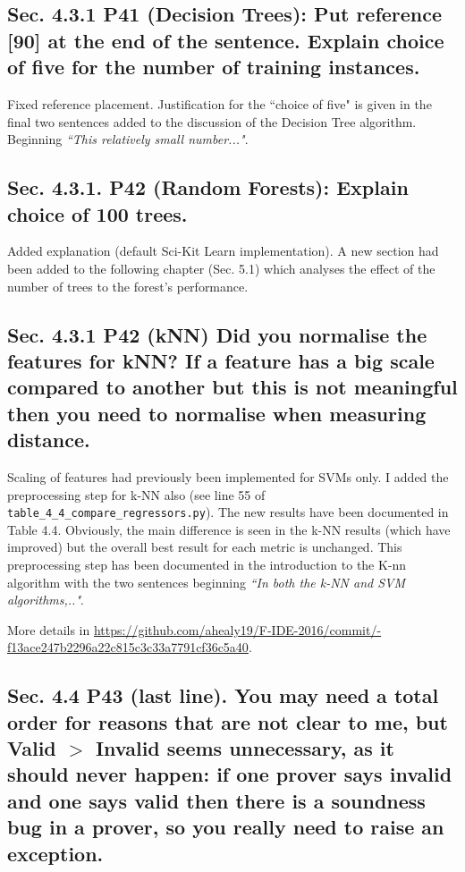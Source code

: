 \documentclass[]{article}
\begin{document}
\subsection{Sec. 4.3.1 P41 (Decision Trees): Put reference [90] at the end of the sentence. Explain choice of five for the number of training instances.}

Fixed reference placement. Justification for the ``choice of five" is given in the final two sentences added to the discussion of the Decision Tree algorithm. Beginning \emph{``This relatively small number..."}. 

\subsection{Sec. 4.3.1. P42 (Random Forests): Explain choice of 100 trees.} 
	
Added explanation (default Sci-Kit Learn implementation).
A new section had been added to the following chapter (Sec. 5.1) which analyses the effect of the number of trees to the forest's performance.	
	
\subsection{Sec. 4.3.1 P42 (kNN) Did you normalise the features for kNN? If a feature has a big scale compared to another but this is not meaningful then you need to normalise when measuring distance.}

Scaling of features had previously been implemented for SVMs only. I added the preprocessing step for k-NN also (see line 55 of \texttt{table\_4\_4\_compare\_regressors.py}). 
The new results have been documented in Table 4.4. 
Obviously, the main difference is seen in the k-NN results (which have improved) but the overall best result for each metric is unchanged.
This preprocessing step has been documented in the introduction to the K-nn algorithm with the two sentences beginning \emph{``In both the k-NN and SVM algorithms,.."}. 

\sloppypar
More details in \url{https://github.com/ahealy19/F-IDE-2016/commit/-f13ace247b2296a22c815c3c33a7791cf36c5a40}.

\subsection{Sec. 4.4 P43 (last line). You may need a total order for reasons that are not clear to me, but Valid $>$ Invalid seems unnecessary, as it should never happen: if one prover says invalid and one says valid then there is a soundness bug in a prover, so you really need to raise an exception.}
\end{document}

